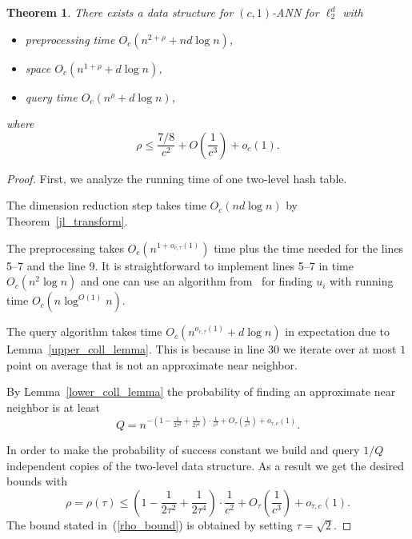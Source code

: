 \documentclass[11pt,letterpaper]{article}
\newtheorem{theorem}{Theorem}
\begin{document}
\begin{theorem}
    \label{the_main_result}
    There exists a data structure for $(c, 1)$-ANN for $\ell_2^d$ with
    \begin{itemize}
        \item preprocessing time $O_c(n^{2 + \rho} + nd \log n)$,
        \item space $O_c(n^{1 + \rho} + d \log n)$,
        \item query time $O_c(n^{\rho} + d \log n)$,
    \end{itemize}
    where
    \begin{equation}
        \label{rho_bound}
        \rho \leq \frac{7/8}{c^2} + O\left(\frac{1}{c^3}\right) + o_c(1).
    \end{equation}
\end{theorem}
\begin{proof}
    First, we analyze the running time of one two-level hash table.

    The dimension reduction step takes time $O_c(nd \log n)$ by Theorem~\ref{jl_transform}.

    The preprocessing takes $O_c(n^{1 + o_{c, \tau}(1)})$ time plus the time needed for the lines 5--7 and the line 9.
    It is straightforward to implement lines 5--7 in time $O_c(n^2 \log n)$ and one can use
    an algorithm from~\cite{gls-gaco-88} for finding $u_i$ with running time $O_c(n \log^{O(1)} n)$.

    The query algorithm takes time $O_c(n^{o_{c, \tau}(1)} + d \log n)$ in expectation due to Lemma~\ref{upper_coll_lemma}.
    This is because in line 30 we iterate over at most $1$ point on average that is not an approximate near neighbor.

    By Lemma~\ref{lower_coll_lemma} the probability of finding an approximate near neighbor is at least
    $$
        Q =  
        n^{-\left(1 - \frac{1}{2 \tau^2} + \frac{1}{2 \tau^4}\right) \cdot \frac{1}{c^2} + O_{\tau}\left(\frac{1}{c^3}\right) + o_{\tau, c}(1)}.
    $$

    In order to make the probability of success constant we build and query $1 / Q$ independent copies of the two-level data structure.
    As a result we get the desired bounds with
    $$
        \rho = \rho(\tau) \leq \left(1 - \frac{1}{2 \tau^2} + \frac{1}{2 \tau^4}\right) \cdot \frac{1}{c^2} + O_{\tau}\left(\frac{1}{c^3}\right) + o_{\tau, c}(1).
    $$
    The bound stated in~(\ref{rho_bound}) is obtained by setting $\tau = \sqrt{2}$.


\end{proof}
\end{document}

